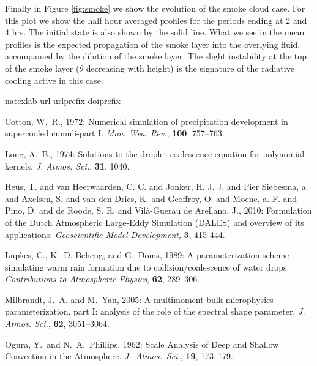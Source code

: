 \documentclass[11pt,a4paper]{article}
\begin{document}
Finally in Figure \ref{fig:smoke} we show the evolution of the smoke
cloud case. For this plot we show the half hour averaged profiles for
the periods ending at 2 and 4 hrs. The initial state is also shown by
the solid line. What we see in the mean profiles is the expected
propagation of the smoke layer into the overlying fluid, accompanied
by the dilution of the smoke layer.  The slight instability at the top
of the smoke layer ($\theta$ decreasing with height) is the signature
of the radiative cooling active in this case.
\newpage
\begin{thebibliography}{8}
\expandafter\ifx\csname natexlab\endcsname\relax\def\natexlab#1{#1}\fi
\expandafter\ifx\csname url\endcsname\relax
  \def\url#1{{\tt #1}}\fi
\expandafter\ifx\csname urlprefix\endcsname\relax\def\urlprefix{URL }\fi
\expandafter\ifx\csname doiprefix\endcsname\relax\def\doiprefix{doi:}\fi

Cotton, W.~R., 1972: Numerical simulation of precipitation development in
  supercooled cumuli-part {I}. {\it Mon. Wea. Rev.\/}, {\bf 100}, 757--763.

Long, A.~B., 1974: Solutions to the droplet coalescence equation for polynomial
  kernels. {\it J. Atmos. Sci.\/}, {\bf 31}, 1040.
  
Heus, T. and van Heerwaarden, C. C. and Jonker, H. J. J. and Pier Siebesma, 
a. and Axelsen, S. and van den Dries, K. and Geoffroy, O. and Moene, a. F. and
Pino, D. and de Roode, S. R. and Vil\`{a}-Guerau de Arellano, J., 2010:
Formulation of the Dutch Atmospheric Large-Eddy Simulation (DALES)
and overview of its applications. {\it Geoscientific Model Development\/}, {\bf 3}, 415-444.

L\"upkes, C., K.~D. Beheng, and G.~Doms, 1989: A parameterization scheme
  simulating warm rain formation due to collision/coalescence of water drops.
  {\it Contributions to Atmospheric Physics\/}, {\bf 62}, 289--306.

Milbrandt, J.~A. and M.~Yau, 2005: A multimoment bulk microphysics
  parameterization. part {I}: analysis of the role of the spectral shape
  parameter. {\it J. Atmos. Sci.\/}, {\bf 62}, 3051--3064.

Ogura, Y.\ and  N.\ A.\ Phillips, 1962: Scale Analysis of Deep and Shallow Convection in the Atmosphere. {\it J.\ Atmos.\ Sci.\/}, {\bf 19}, 173--179.


\end{thebibliography}
\end{document}
